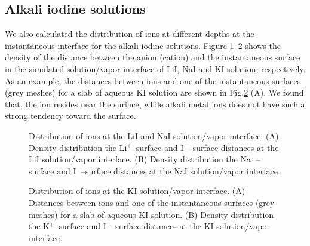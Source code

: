 \subsection{Alkali iodine solutions}
We also calculated the distribution of ions at different depths at the instantaneous interface for the alkali iodine solutions.
Figure \ref{fig:prob_dist_Li_surf_I_surf}--\ref{fig:prob_dist_K_surf_I_surf} shows the density of the distance between the anion (cation) 
and the instantaneous surface in the simulated solution/vapor interface of LiI, NaI and KI solution, respectively. 
As an example, the distances between ions and one of the instantaneous surfaces (grey meshes) 
for a slab of aqueous KI solution are shown in Fig.\thinspace\ref{fig:prob_dist_K_surf_I_surf} (A). 
We found that, the \I ion resides near the surface, while alkali metal ions does not have such a strong tendency toward the surface. 
\begin{figure}[H]%
    \centering
    \qquad
    \caption{
Distribution of ions at the LiI and NaI solution/vapor interface.   
(A) 
Density distribution the Li$^+$--surface and I$^-$--surface distances at the LiI solution/vapor interface. 
(B)
Density distribution the Na$^+$--surface and I$^-$--surface distances at the NaI solution/vapor interface. 
}%
    \label{fig:prob_dist_Li_surf_I_surf}%
\end{figure}
\begin{figure}[H]%
    \centering
    \qquad
    \caption{
Distribution of ions at the KI solution/vapor interface.   
(A) 
Distances between ions and one of the instantaneous surfaces (grey meshes) for a slab of aqueous KI solution. 
(B)
Density distribution the K$^+$--surface and I$^-$--surface distances at the KI solution/vapor interface. 
}%
    \label{fig:prob_dist_K_surf_I_surf}%
\end{figure}


